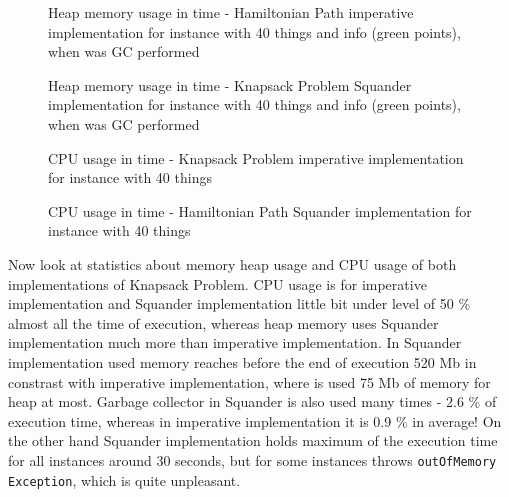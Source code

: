 \documentclass[11pt,twoside,a4paper]{book}
\begin{document}
\begin{figure}
\begin{center}

\caption{Heap memory usage in time - Hamiltonian Path imperative implementation
for instance with 40 things and info (green points), when was GC performed}
\label{fig:ksIMem40}
\end{center}
\end{figure}





\begin{figure}
\begin{center}

\caption{Heap memory usage in time - Knapsack Problem Squander implementation
for instance with 40 things and info (green points),
when was GC performed}
\label{fig:ksSMem40}
\end{center}
\end{figure}


\begin{figure}
\begin{center}

\caption{CPU usage in time - Knapsack Problem imperative implementation for instance with 40 things}
\label{fig:ksICpu40}
\end{center}
\end{figure}


\begin{figure}[ht]
\begin{center}

\caption{CPU usage in time - Hamiltonian Path Squander implementation for instance with 40 things}
\label{fig:ksSCpu40}
\end{center}
\end{figure}
\clearpage 

Now look at statistics about memory heap usage and CPU usage of both
implementations of Knapsack Problem. CPU usage is for imperative implementation
and Squander implementation little bit under level of 50 \% almost all the time
of execution, whereas heap memory uses Squander implementation much more than imperative
implementation. In Squander implementation used memory reaches before the end of
execution 520 Mb in constrast with imperative implementation, where is used 75
Mb of memory for heap at most. Garbage collector in Squander is also used many
times - 2.6 \% of execution time, whereas in imperative implementation it is
0.9 \% in average! On the other hand Squander implementation holds maximum of
the execution time for all instances around 30 seconds, but for some instances throws
\verb|outOfMemory Exception|, which is quite unpleasant.
\end{document}
